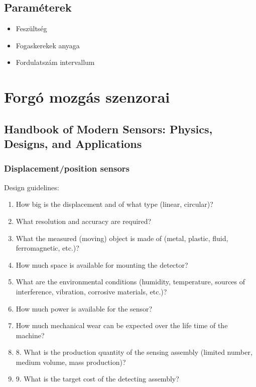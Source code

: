 \documentclass{article}
\begin{document}
	\subsection{Paraméterek}
	\begin{itemize}
		\item Feszültség
		\item Fogaskerekek anyaga
		\item Fordulatszám intervallum
		
	\end{itemize}
	
	
	
	\section{Forgó mozgás szenzorai}
	
	\subsection{Handbook of Modern Sensors: Physics, Designs, and Applications}
	\subsubsection{Displacement/position sensors}
	Design guidelines:
	\begin{enumerate}
		\item How big is the displacement and of what type (linear, circular)?
		\item What resolution and accuracy are required?
		\item What the measured (moving) object is made of (metal, plastic, fluid, ferromagnetic, etc.)?
		\item How much space is available for mounting the detector?
		\item What are the environmental conditions (humidity, temperature, sources of
		interference, vibration, corrosive materials, etc.)?
		\item How much power is available for the sensor?
		\item How much mechanical wear can be expected over the life time of the machine?
		\item 8. What is the production quantity of the sensing assembly (limited number,
		medium volume, mass production)?
		\item 9. What is the target cost of the detecting assembly?
	\end{enumerate}
	
\end{document}
